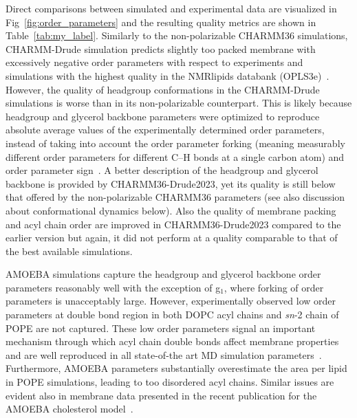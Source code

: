 \documentclass[journal=jacsat,manuscript=article,layout=singlecolumn]{achemso}
\begin{document}
Direct comparisons between simulated and experimental data are visualized in Fig~\ref{fig:order_parameters} and the resulting quality metrics are shown in Table~\ref{tab:my_label}. Similarly to the non-polarizable CHARMM36 simulations, CHARMM-Drude simulation predicts slightly too packed membrane with excessively negative order parameters with respect to experiments and simulations with the highest quality in the NMRlipids databank (OPLS3e)~\cite{Databank}. However,
the quality of headgroup conformations in the CHARMM-Drude simulations is worse than in its non-polarizable counterpart. This is likely because headgroup and glycerol backbone parameters were optimized to reproduce absolute average values of the experimentally determined order parameters, instead of taking into account the order parameter forking (meaning measurably different order parameters for different C--H bonds at a single carbon atom) and order parameter sign~\cite{Antila2022}. A better description of the headgroup and glycerol backbone is provided by CHARMM36-Drude2023, yet its quality is still below that offered by the non-polarizable CHARMM36 parameters (see also discussion about conformational dynamics below). Also the quality of membrane packing and acyl chain order are improved in CHARMM36-Drude2023 compared to the earlier version but again, it did not perform at a quality comparable to that of the best available simulations.

 AMOEBA simulations capture the headgroup and glycerol backbone order parameters reasonably well with the exception of g$_1$,
where forking of order parameters is unacceptably large. However, experimentally observed low order parameters at double bond region in both DOPC acyl chains and {\it sn}-2 chain of POPE are not captured. These low order parameters signal an important mechanism through which acyl chain double bonds affect membrane properties~\cite{ollila07} and are well reproduced in all state-of-the art MD simulation parameters~\cite{ollila16}. Furthermore, AMOEBA parameters substantially overestimate the area per lipid in POPE simulations, leading to too disordered acyl chains. Similar issues are evident also in membrane data presented in the recent publication for the AMOEBA cholesterol model~\cite{Li23chol}.
 
\end{document}

